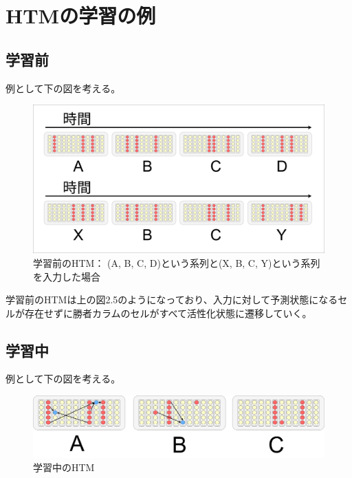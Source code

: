 \section{HTMの学習の例}

\subsection{学習前}
例として下の図を考える。

\begin{figure}[ht]
  \begin{center}
    \includegraphics[width=14cm]{./fig/drawing_5}
    \caption{学習前のHTM： (A, B, C, D)という系列と(X, B, C, Y)という系列を入力した場合}
    \label{fig:HTM_before_learning}
  \end{center}
\end{figure}

学習前のHTMは上の図2.5のようになっており、入力に対して予測状態になるセルが存在せずに勝者カラムのセルがすべて活性化状態に遷移していく。

\subsection{学習中}
例として下の図を考える。

\begin{figure}[ht]
  \begin{center}
    \includegraphics[width=14cm]{./fig/drawing_7}
    \caption{学習中のHTM}
    \label{fig:HTM_during_learning}
  \end{center}
\end{figure}

